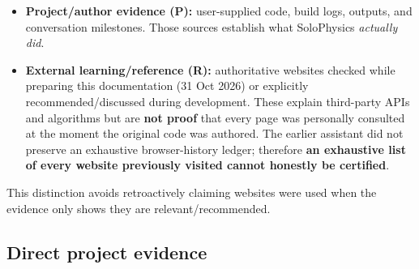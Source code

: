 \documentclass[
  10pt,
  a4paper,
]{article}
\providecommand{\tightlist}{%
  \setlength{\itemsep}{0pt}\setlength{\parskip}{0pt}}
\begin{document}
\begin{itemize}
\tightlist
\item
  \textbf{Project/author evidence (P):} user-supplied code, build logs,
  outputs, and conversation milestones. Those sources establish what
  SoloPhysics \emph{actually did}.
\item
  \textbf{External learning/reference (R):} authoritative websites
  checked while preparing this documentation (31 Oct 2026) or explicitly
  recommended/discussed during development. These explain third-party
  APIs and algorithms but are \textbf{not proof} that every page was
  personally consulted at the moment the original code was authored. The
  earlier assistant did not preserve an exhaustive browser-history
  ledger; therefore \textbf{an exhaustive list of every website
  previously visited cannot honestly be certified}.
\end{itemize}

This distinction avoids retroactively claiming websites were used when
the evidence only shows they are relevant/recommended.

\subsection{Direct project evidence}\label{direct-project-evidence}
\end{document}
